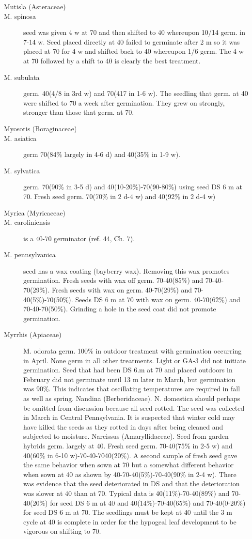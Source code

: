 \begin{description}
\item[Mutisla (Asteraceae)]
\item[M. spinosa] seed was given 4 w at 70 and then shifted to 40 whereupon 10/14
germ. in 7-14 w. Seed placed directly at 40 failed to germinate after 2 m so it was
placed at 70 for 4 w and shifted back to 40 whereupon 1/6 germ. The 4 w at 70
followed by a shift to 40 is clearly the best treatment.
\item[M. subulata] germ. 40(4/8 in 3rd w) and 70(417 in 1-6 w). The seedling that
germ. at 40 were shifted to 70 a week after germination. They grew on strongly,
stronger than those that germ. at 70.
\item[Myosotis (Boraginaceae)]
\item[M. asiatica] germ 70(84\% largely in 4-6 d) and 40(35\% in 1-9 w).
\item[M. sylvatica] germ. 70(90\% in 3-5 d) and 40(10-20\%)-70(90-80\%) using seed
DS 6 m at 70. Fresh seed germ. 70(70\% in 2 d-4 w) and 40(92\% in 2 d-4 w)
\item[Myrica (Myricaceae)]
\item[M. caroliniensis] is a 40-70 germinator (ref. 44, Ch. 7).
\item[M. pennsylvanica] seed has a wax coating (bayberry wax). Removing this wax
promotes germination. Fresh seeds with wax off germ. 70-40(85\%) and 70-40-
70(29\%). Fresh seeds with wax on germ. 40-70(29\%) and 70-40(5\%)-70(50\%).
Seeds DS 6 m at 70 with wax on germ. 40-70(62\%) and 70-40-70(50\%). Grinding a
hole in the seed coat did not promote germination.
\item[Myrrhis (Apiaceae)] M. odorata germ. 100\% in outdoor treatment with
germination occurring in April. None germ in all other treatments. Light or GA-3 did
not initiate germination. Seed that had been DS 6.m at 70 and placed outdoors in
February did not germinate until 13 m later in March, but germination was 90\%. This
indicates that oscillating temperatures are required in fall as well as spring.
Nandina (Berberidaceae). N. domestica should perhaps be omitted from
discussion because all seed rotted. The seed was collected in March in Central
Pennsylvania. It is suspected that winter cold may have killed the seeds as they rotted
in days after being cleaned and subjected to moisture.
Narcissus (Amaryllidaceae). Seed from garden hybrids germ. largely at
40. Fresh seed germ. 70-40(75\% in 2-5 w) and 40(60\% in 6-10 w)-70-40-7040(20\%).
A second sample of fresh seed gave the same behavior when sown at 70 but a
somewhat different behavior when sown at 40 as shown by 40-70-40(5\%)-70-40(90\%
in 2-4 w). There was evidence that the seed deteriorated in DS and that the
deterioration was slower at 40 than at 70. Typical data is 40(11\%)-70-40(89\%) and 70-
40(20\%) for seed DS 6 m at 40 and 40(14\%)-70-40(65\%) and 70-40(0-20\%) for seed
DS 6 m at 70. The seedlings must be kept at 40 until the 3 m cycle at 40 is complete in
order for the hypogeal leaf development to be vigorous on shifting to 70.

\end{description}
